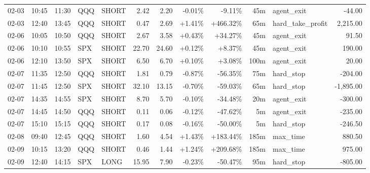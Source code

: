 \documentclass[11pt,a4paper,twoside]{article}
\begin{document}
\begin{center}
\begin{longtable}{>{\color{txtmain}}l l l l l r r r r r >{\color{txtmain}}l r}
02-03 & 10:45 & 11:30 & QQQ & SHORT & 2.42 & 2.20 & \textcolor{lossred}{-0.01\%} & \textcolor{lossred}{-9.11\%} & 45m & agent\_exit & \textcolor{lossred}{-44.00} \\
02-03 & 12:40 & 13:45 & QQQ & SHORT & 0.47 & 2.69 & \textcolor{wingreen}{+1.41\%} & \textcolor{wingreen}{+466.32\%} & 65m & hard\_take\_profit & \textcolor{wingreen}{2,215.00} \\
02-06 & 10:05 & 10:50 & QQQ & SHORT & 2.67 & 3.58 & \textcolor{wingreen}{+0.43\%} & \textcolor{wingreen}{+34.27\%} & 45m & agent\_exit & \textcolor{wingreen}{91.50} \\
02-06 & 10:10 & 10:55 & SPX & SHORT & 22.70 & 24.60 & \textcolor{wingreen}{+0.12\%} & \textcolor{wingreen}{+8.37\%} & 45m & agent\_exit & \textcolor{wingreen}{190.00} \\
02-06 & 12:10 & 13:50 & SPX & SHORT & 6.50 & 6.70 & \textcolor{wingreen}{+0.10\%} & \textcolor{wingreen}{+3.08\%} & 100m & agent\_exit & \textcolor{wingreen}{20.00} \\
02-07 & 11:35 & 12:50 & QQQ & SHORT & 1.81 & 0.79 & \textcolor{lossred}{-0.87\%} & \textcolor{lossred}{-56.35\%} & 75m & hard\_stop & \textcolor{lossred}{-204.00} \\
02-07 & 11:45 & 12:50 & SPX & SHORT & 32.10 & 13.15 & \textcolor{lossred}{-0.70\%} & \textcolor{lossred}{-59.03\%} & 65m & hard\_stop & \textcolor{lossred}{-1,895.00} \\
02-07 & 14:35 & 14:55 & SPX & SHORT & 8.70 & 5.70 & \textcolor{lossred}{-0.10\%} & \textcolor{lossred}{-34.48\%} & 20m & agent\_exit & \textcolor{lossred}{-300.00} \\
02-07 & 14:45 & 14:50 & QQQ & SHORT & 0.11 & 0.06 & \textcolor{lossred}{-0.12\%} & \textcolor{lossred}{-47.62\%} & 5m & agent\_exit & \textcolor{lossred}{-235.00} \\
02-07 & 15:10 & 15:15 & QQQ & SHORT & 0.17 & 0.08 & \textcolor{lossred}{-0.16\%} & \textcolor{lossred}{-50.00\%} & 5m & hard\_stop & \textcolor{lossred}{-246.50} \\
02-08 & 09:40 & 12:45 & QQQ & SHORT & 1.60 & 4.54 & \textcolor{wingreen}{+1.43\%} & \textcolor{wingreen}{+183.44\%} & 185m & max\_time & \textcolor{wingreen}{880.50} \\
02-09 & 10:15 & 13:20 & QQQ & SHORT & 0.46 & 1.44 & \textcolor{wingreen}{+1.24\%} & \textcolor{wingreen}{+209.68\%} & 185m & max\_time & \textcolor{wingreen}{975.00} \\
02-09 & 12:40 & 14:15 & SPX & LONG & 15.95 & 7.90 & \textcolor{lossred}{-0.23\%} & \textcolor{lossred}{-50.47\%} & 95m & hard\_stop & \textcolor{lossred}{-805.00} \\

\end{longtable}
\end{center}
\end{document}
